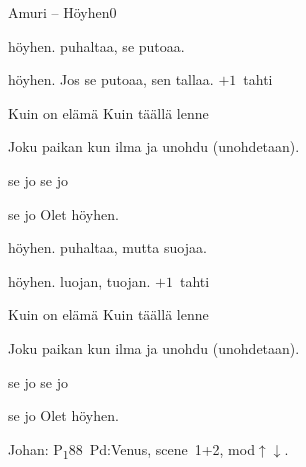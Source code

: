 \documentclass[12pt,a4paper]{article}
\begin{document}
\thispagestyle{empty}
\begin{mysong}{Amuri – Höyhen}{0}


\begin{SBVerse}
   höyhen.  puhaltaa,  se putoaa.

   höyhen. Jos se  putoaa,  sen
  tallaa. {\SBLyricNoteFont $+1$~tahti}
\end{SBVerse}

\begin{SBChorus}
  Kuin  on elämä  Kuin  täällä
  lenne

  Joku  paikan  kun ilma  ja
  unohdu (unohdetaan).

     se jo 
     se jo 

     se jo  Olet
  höyhen.
\end{SBChorus}


\begin{SBVerse}
   höyhen.  puhaltaa, mutta 
  suojaa.

   höyhen.  luojan,  tuojan.
  {\SBLyricNoteFont $+1$~tahti}
\end{SBVerse}

\begin{SBChorus}
  Kuin  on elämä  Kuin  täällä
  lenne

  Joku  paikan  kun ilma  ja
  unohdu (unohdetaan).

     se jo 
     se jo 

     se jo  Olet
  höyhen.
\end{SBChorus}


{\SBLyricNoteFont Johan: P\textsubscript{1}88~Pd:Venus, scene~1+2,
mod$\uparrow\downarrow$.}

\end{mysong}
\end{document}
